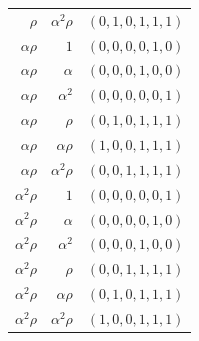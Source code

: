 \begin{longtable}{rrl}
$\rho$ & $\alpha^2\rho$ & $(0,1,0,1,1,1)$\\
$\alpha\rho$ & $1$ & $(0,0,0,0,1,0)$\\
$\alpha\rho$ & $\alpha$ & $(0,0,0,1,0,0)$\\
$\alpha\rho$ & $\alpha^2$ & $(0,0,0,0,0,1)$\\
$\alpha\rho$ & $\rho$ & $(0,1,0,1,1,1)$\\
$\alpha\rho$ & $\alpha\rho$ & $(1,0,0,1,1,1)$\\
$\alpha\rho$ & $\alpha^2\rho$ & $(0,0,1,1,1,1)$\\
$\alpha^2\rho$ & $1$ & $(0,0,0,0,0,1)$\\
$\alpha^2\rho$ & $\alpha$ & $(0,0,0,0,1,0)$\\
$\alpha^2\rho$ & $\alpha^2$ & $(0,0,0,1,0,0)$\\
$\alpha^2\rho$ & $\rho$ & $(0,0,1,1,1,1)$\\
$\alpha^2\rho$ & $\alpha\rho$ & $(0,1,0,1,1,1)$\\
$\alpha^2\rho$ & $\alpha^2\rho$ & $(1,0,0,1,1,1)$\\
\end{longtable}
\endgroup
